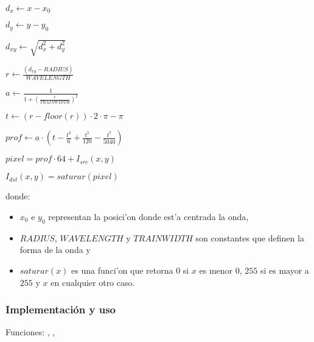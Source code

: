 \begin{algorithm}[H]
  \begin{algorithmic}[1]
      \STATE $d_x \gets x - x_0$

      \STATE

      \STATE $d_y \gets y - y_0$

      \STATE

      \STATE $d_{xy} \gets \sqrt{d_{x}^2+d_{y}^2}$

      \STATE

      \STATE $r \gets \frac{(d_{xy} - RADIUS)}{WAVELENGTH}$

      \STATE

      \STATE $a \gets \frac{1}{1 + (\frac{r}{TRAINWIDTH})^2 }$

      \STATE

      \STATE $t \gets ( r-floor(r) ) \cdot 2 \cdot \pi - \pi$

      \STATE

      \STATE $prof \gets a \cdot (t - \frac{t^3}{6}+\frac{t^5}{120}-\frac{t^7}{5040})$

      \STATE

      \STATE $pixel = prof \cdot 64 + I_{src}(x, y)$    

      \STATE

      \STATE $I_{dst}(x, y) = saturar(pixel)$
    \ENDFOR
  \end{algorithmic}
  \caption{$ondas (I_{src}, I_{dst}, x_0, y_0)$}
  \label{alg:ondas}
\end{algorithm}

donde:

\begin{itemize}
  \item $x_0$ e $y_0$ representan la posici'on donde est'a centrada la onda,
  \item $RADIUS$, $WAVELENGTH$ y $TRAINWIDTH$ son constantes que definen la 
  forma de la onda y
  \item $saturar(x)$ es una funci'on que retorna $0$ si $x$ es menor $0$, $255$
  si es mayor a $255$ y $x$ en cualquier otro caso.
\end{itemize}

\subsubsection*{Implementación y uso}

\noindent Funciones: , ,

